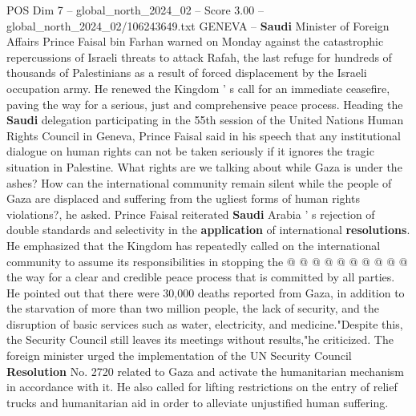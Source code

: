 \begin{textsample}{POS Dim 7 – global\_north\_2024\_02 – Score 3.00 – global\_north\_2024\_02/106243649.txt}  \label{ex:f7_pos_165}
GENEVA -- \textbf{Saudi} Minister of Foreign Affairs Prince Faisal bin Farhan warned on Monday against the catastrophic repercussions of Israeli threats to attack Rafah, the last refuge for hundreds of thousands of Palestinians as a result of forced displacement by the Israeli occupation army.
He renewed the Kingdom ' s call for an immediate ceasefire, paving the way for a serious, just and comprehensive peace process.
Heading the \textbf{Saudi} delegation participating in the 55th session of the United Nations Human Rights Council in Geneva, Prince Faisal said in his speech that any institutional dialogue on human rights can not be taken seriously if it ignores the tragic situation in Palestine.
What rights are we talking about while Gaza is under the ashes?
How can the international community remain silent while the people of Gaza are displaced and suffering from the ugliest forms of human rights violations?, he asked.
Prince Faisal reiterated \textbf{Saudi} Arabia ' s rejection of double standards and selectivity in the \textbf{application} of international \textbf{resolutions}.
He emphasized that the Kingdom has repeatedly called on the international community to assume its responsibilities in stopping the @ @ @ @ @ @ @ @ @ @ the way for a clear and credible peace process that is committed by all parties.
He pointed out that there were 30,000 deaths reported from Gaza, in addition to the starvation of more than two million people, the lack of security, and the disruption of basic services such as water, electricity, and medicine."Despite this, the Security Council still leaves its meetings without results,"he criticized.
The foreign minister urged the implementation of the UN Security Council \textbf{Resolution} No. 2720 related to Gaza and activate the humanitarian mechanism in accordance with it.
He also called for lifting restrictions on the entry of relief trucks and humanitarian aid in order to alleviate unjustified human suffering.

\end{textsample}
